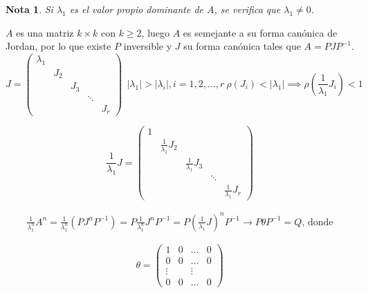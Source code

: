 \documentclass[11pt, a4paper]{article}
\makeatletter
\newif\IfInSansMode
\let\oldsf\sffamily
\renewcommand*{\sffamily}{\oldsf\mathversion{sans}\InSansModetrue}
\let\oldnorm\normalfont
\renewcommand*{\normalfont}{\oldnorm\InSansModefalse\mathversion{normal}}
\renewenvironment{proof}[1][\proofname] {\vspace{-15pt}\par\pushQED{\qed}\normalfont\topsep6\p@\@plus6\p@\relax\trivlist\item[\hskip\labelsep\it#1\@addpunct{.}]\ignorespaces}{\popQED\endtrivlist\@endpefalse}
\numberwithin{equation}{section}
\renewenvironment{proof}[1][\proofname] {\par\pushQED{\qed}\normalfont\topsep6\p@\@plus6\p@\relax\trivlist\item[\hskip\labelsep\itshape\sffamily#1\@addpunct{.}]\ignorespaces}{\popQED\endtrivlist\@endpefalse}
\theoremstyle{theorem-style}
\theoremstyle{definition-style}
\theoremstyle{remark-style}
\newtheorem*{nota}{Nota}
\theoremstyle{example-style}
\makeatother
\begin{document}
\begin{nota}
	Si $\lambda_1$ es el valor propio dominante de $A$, se verifica que $\lambda_1 \ne 0$.
\end{nota}

\begin{proof}
    $A$ es una matriz $k \times k$ con $k \geq 2$, luego $A$ es semejante a su forma  canónica de Jordan, por lo que existe $P$ inversible y $J$ su forma canónica tales que $A = PJP^{-1}$.
    $$J = \begin{pmatrix}
        \lambda_1 & & & & \\
                  & J_2 & & & \\
                  & & J_3 & & \\
                  & & & \ddots & \\
                  & & & & J_r
    \end{pmatrix} \ \ |\lambda_1| > |\lambda_i|, i = 1, 2, \hdots, r \ \rho(J_i) < |\lambda_1| \implies \rho \left(\frac{1}{\lambda_1}J_i\right) < 1$$

    $$\frac{1}{\lambda_1}J = \begin{pmatrix}
        1 & & & &\\
          & \frac{1}{\lambda_1}J_2 & & &\\
          & & \frac{1}{\lambda_1}J_3 & & \\
          & & & \ddots & \\
          & & & & \frac{1}{\lambda_1}J_r
    \end{pmatrix}$$

    \begin{align*}
        \label{}
        \frac{1}{\lambda_1^n} A^n = \frac{1}{\lambda_1^n}(PJ^nP^{-1}) = P \frac{1}{\lambda_1^n}J^nP^{-1} = P\left(\frac{1}{\lambda_1}J\right)^nP^{-1} \to P\theta P^{-1} = Q \text{, donde}
    \end{align*}
    
    $$\theta = \begin{pmatrix}
        1 & 0 & \hdots & 0 \\
        0 & 0 & \hdots & 0 \\
        \vdots & & \vdots & \\
        0 & 0 & \hdots & 0
    \end{pmatrix}$$


\end{proof}
\end{document}
